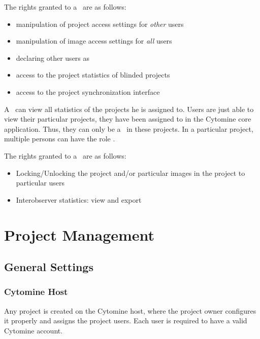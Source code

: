The rights granted to a \pjcoord\ are as follows:
\begin{itemize}
\item manipulation of project access settings for \emph{other} users
\item manipulation of image access settings for \emph{all} users
\item declaring other users as \pjcoord
\item access to the project statistics of blinded projects
\item access to the project synchronization interface
\end{itemize}
A \pjcoord\ can view all statistics of the projects he is assigned to. 
Users are just able to view their particular projects, they have been assigned to in the Cytomine core application.
Thus, they can only be a \pjcoord\ in these projects. 
In a particular project, multiple persons can have the role \pjcoord . 

The rights granted to a \pjcoord\ are as follows:
\begin{itemize}
\item Locking/Unlocking the project and/or particular images in the project to particular users
\item Interobserver statistics: view and export
\end{itemize}



%



\chapter{Project Management}

\section{General Settings}
\subsection{Cytomine Host}
Any project is created on the Cytomine host, where the project owner configures it properly and assigns the project users. 
Each user is required to have a valid Cytomine account. 

